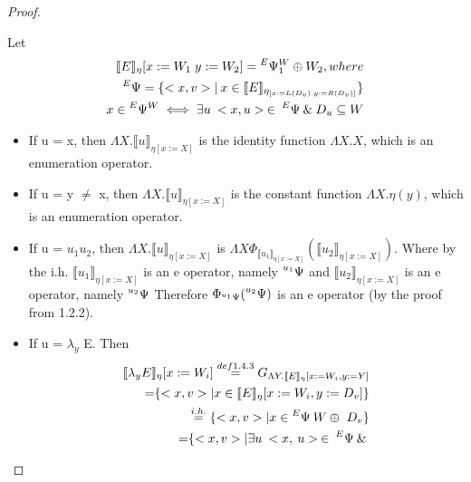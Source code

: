 \documentclass{article}
\begin{document}
\begin{proof}
\begin{enumerate}
 				Let 
				\begin{equation*}
				\begin{split}
					\llbracket E \rrbracket_\eta[x := W_1\; y := W_2]
					= \prescript{E}{}{\Psi}{}{}^W_1 \oplus W_2, where\\
					\prescript{E}{}{\Psi}{}{} = \{<x, v> |\:x \in 
					\llbracket E \rrbracket_{\eta_{
					[x := L(D_v)\; y := R(D_v)]}}\}\\
					x \in \prescript{E}{}{\Psi}{}{}^W \iff \exists u \: 
					<x, u>\:\in\:\prescript{E}{}{\Psi}{}{}\:\&\: 
					D_u \subseteq W
				\end{split}
				\end{equation*}
				\begin{itemize}
  				\item If u = x, then 
					$\Lambda X. \llbracket u \rrbracket_{\eta [x := X]}$
					is the identity function $\Lambda X. X$, which is 
					an enumeration operator.
  				\item If u = y $\neq$ x, then 
					$\Lambda X. \llbracket u \rrbracket_{\eta [x := X]}$
					is the constant function $\Lambda X. \eta(y)$, which
					is an enumeration operator.
  				\item If u = $u_1 u_2$, then
					$\Lambda X. \llbracket u \rrbracket_{\eta [x := X]}$
					is $\Lambda X \Phi_{\llbracket u_1 \rrbracket_{\eta 
					[x := X]}} (\llbracket u_2 \rrbracket_{\eta 
					[x := X]})$. Where by the i.h. 
					$\llbracket u_1 \rrbracket_{\eta [x := X]}$
					is an e operator, namely
					$\prescript{u_1}{}{\Psi}{}{}$
					and 
					$\llbracket u_2 \rrbracket_{\eta [x := X]}$
					is an e operator, namely 
					$\prescript{u_2}{}{\Psi}{}{}$
					Therefore $\Phi_{\prescript{u_1}{}{\Psi}{}{}} 										(\prescript{u_2}{}{\Psi}{}{})$ is an e operator
					(by the proof from 1.2.2).
  				\item If u = $\lambda_y$ E.
				Then
				\begin{equation*}
				\begin{split}
					\llbracket \lambda_y E \rrbracket_\eta{ [x := W_i]}
					\stackrel{def 1.4.3}{=}
					G_{\Lambda Y. \llbracket E \rrbracket_\eta
					{[x := W_i, y:= Y]}}
					\\{=}
					\{<x, v> | x \in 
					\llbracket E \rrbracket_\eta {[x := W_i, y:= D_v]}\}
					\\\stackrel{i.h.}{=}
					\{<x, v> | x \in 
					\prescript{E}{}{\Psi}{}{} \: W \oplus\ D_v\}
					\\{=}
					\{<x, v> | \exists u \:	<x,\:u>\:\in\:
					\prescript{E}{}{\Psi}{}{}\:\&\: 

\end{split}
\end{equation*}
\end{itemize}
\end{enumerate}
\end{proof}
\end{document}
